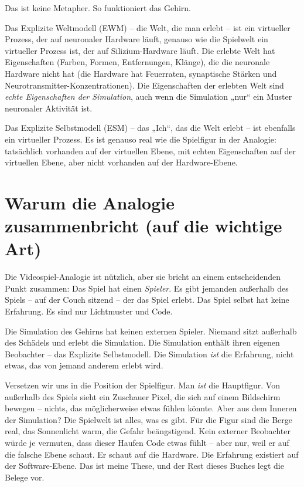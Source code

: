 \documentclass[11pt, twoside, openright]{book}
\begin{document}
Das ist keine Metapher. So funktioniert das Gehirn.

Das Explizite Weltmodell (EWM) -- die Welt, die man erlebt -- ist ein virtueller Prozess, der auf neuronaler Hardware läuft, genauso wie die Spielwelt ein virtueller Prozess ist, der auf Silizium-Hardware läuft. Die erlebte Welt hat Eigenschaften (Farben, Formen, Entfernungen, Klänge), die die neuronale Hardware nicht hat (die Hardware hat Feuerraten, synaptische Stärken und Neurotransmitter-Konzentrationen). Die Eigenschaften der erlebten Welt sind \textit{echte Eigenschaften der Simulation}, auch wenn die Simulation „nur“ ein Muster neuronaler Aktivität ist.

Das Explizite Selbstmodell (ESM) -- das „Ich“, das die Welt erlebt -- ist ebenfalls ein virtueller Prozess. Es ist genauso real wie die Spielfigur in der Analogie: tatsächlich vorhanden auf der virtuellen Ebene, mit echten Eigenschaften auf der virtuellen Ebene, aber nicht vorhanden auf der Hardware-Ebene.

\section*{Warum die Analogie zusammenbricht (auf die wichtige Art)}

Die Videospiel-Analogie ist nützlich, aber sie bricht an einem entscheidenden Punkt zusammen: Das Spiel hat einen \textit{Spieler}. Es gibt jemanden außerhalb des Spiels -- auf der Couch sitzend -- der das Spiel erlebt. Das Spiel selbst hat keine Erfahrung. Es sind nur Lichtmuster und Code.

Die Simulation des Gehirns hat keinen externen Spieler. Niemand sitzt außerhalb des Schädels und erlebt die Simulation. Die Simulation enthält ihren eigenen Beobachter -- das Explizite Selbstmodell. Die Simulation \textit{ist} die Erfahrung, nicht etwas, das von jemand anderem erlebt wird.

Versetzen wir uns in die Position der Spielfigur. Man \textit{ist} die Hauptfigur. Von außerhalb des Spiels sieht ein Zuschauer Pixel, die sich auf einem Bildschirm bewegen -- nichts, das möglicherweise etwas fühlen könnte. Aber aus dem Inneren der Simulation? Die Spielwelt ist alles, was es gibt. Für die Figur sind die Berge real, das Sonnenlicht warm, die Gefahr beängstigend. Kein externer Beobachter würde je vermuten, dass dieser Haufen Code etwas fühlt -- aber nur, weil er auf die falsche Ebene schaut. Er schaut auf die Hardware. Die Erfahrung existiert auf der Software-Ebene. Das ist meine These, und der Rest dieses Buches legt die Belege vor.
\end{document}
